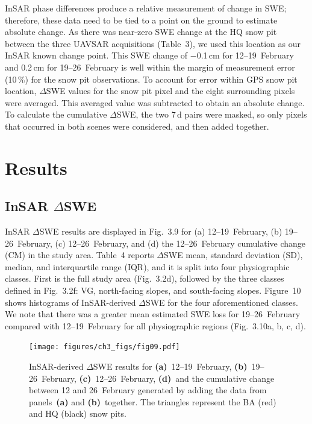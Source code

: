 InSAR phase differences produce a relative measurement of change in SWE; therefore, these data need to be tied to a point on the ground to estimate absolute change. As there was near-zero SWE change at the HQ snow pit between the three UAVSAR acquisitions (Table~3), we used this location as our InSAR known change point. This SWE change of $-0$.1\,cm for 12--19~February and 0.2\,cm for 19--26~February is well within the margin of measurement error (10\,\%) for the snow pit observations. To account for error within GPS snow pit location, $\Delta$SWE values for the snow pit pixel and the eight surrounding pixels were averaged. This averaged value was subtracted to obtain an absolute change. To calculate the cumulative $\Delta$SWE, the two 7\,d pairs were masked, so only pixels that occurred in both scenes were considered, and then added together.

\hypertarget{ch3-results}{\section{Results}\label{ch3-results}}
\hypertarget{ch3-results-1}{\subsection{InSAR $\Delta$SWE}\label{ch3-results-1}}


InSAR $\Delta$SWE results are displayed in Fig.~3.9 for (a) 12--19~February, (b) 19--26~February, (c) 12--26~February, and (d) the 12--26~February cumulative change (CM) in the study area. Table~4 reports $\Delta$SWE mean, standard deviation (SD), median, and interquartile range (IQR), and it is split into four physiographic classes. First is the full study area (Fig.~3.2d), followed by the three classes defined in Fig.~3.2f: VG, north-facing slopes, and south-facing slopes. Figure~10 shows histograms of InSAR-derived $\Delta$SWE for the four aforementioned classes. We note that there was a greater mean estimated SWE loss for 19--26~February compared with 12--19~February for all physiographic regions (Fig.~3.10a, b, c, d).

\begin{figure}[t]
\centering
\texttt{[image: figures/ch3\_figs/fig09.pdf]}
\caption{InSAR-derived $\Delta$SWE results for \textbf{(a)}~12--19~February, \textbf{(b)}~19--26~February, \textbf{(c)}~12--26~February, \textbf{(d)}~and the cumulative change between 12 and 26~February generated by adding the data from panels~\textbf{(a)} and \textbf{(b)}~together. The triangles represent the BA (red) and HQ (black) snow pits.}
\end{figure}

